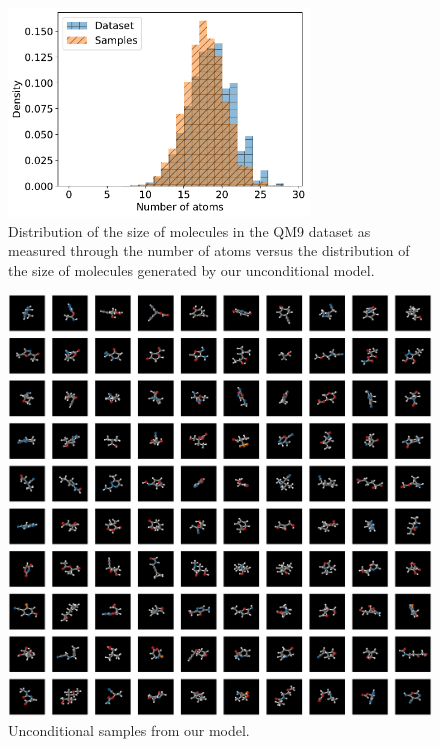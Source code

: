 \begin{figure}
    \centering
    \includegraphics[width=8cm]{figs/tddm/uncond_dims.pdf}
    \caption{Distribution of the size of molecules in the QM9 dataset as measured through the number of atoms versus the distribution of the size of molecules generated by our unconditional model.}
    \label{fig:tddm-uncond_dims}
\end{figure}

\begin{figure}
    \centering
    \includegraphics[width=\textwidth]{figs/tddm/uncond_samples_image_bright.png}
    \caption{Unconditional samples from our model.}
    \label{fig:tddm-apdxUncondMolSamples}
\end{figure}

